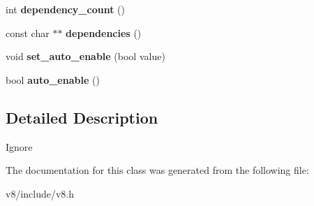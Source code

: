 \begin{DoxyCompactItemize}
\item 
\hypertarget{classv8_1_1Extension_a7623b08e3bc42d903bd923a00317b7f9}{int {\bfseries dependency\-\_\-count} ()}\label{classv8_1_1Extension_a7623b08e3bc42d903bd923a00317b7f9}

\item 
\hypertarget{classv8_1_1Extension_adbec8a811d5a4554678da4a5d55dda6d}{const char $\ast$$\ast$ {\bfseries dependencies} ()}\label{classv8_1_1Extension_adbec8a811d5a4554678da4a5d55dda6d}

\item 
\hypertarget{classv8_1_1Extension_af5b752ba211315b6e9dac5c0e6e638e8}{void {\bfseries set\-\_\-auto\-\_\-enable} (bool value)}\label{classv8_1_1Extension_af5b752ba211315b6e9dac5c0e6e638e8}

\item 
\hypertarget{classv8_1_1Extension_aee87ef4f9c3d7880fc3b28765d28e516}{bool {\bfseries auto\-\_\-enable} ()}\label{classv8_1_1Extension_aee87ef4f9c3d7880fc3b28765d28e516}

\end{DoxyCompactItemize}


\subsection{Detailed Description}
Ignore 

The documentation for this class was generated from the following file\-:\begin{DoxyCompactItemize}
\item 
v8/include/v8.\-h\end{DoxyCompactItemize}
